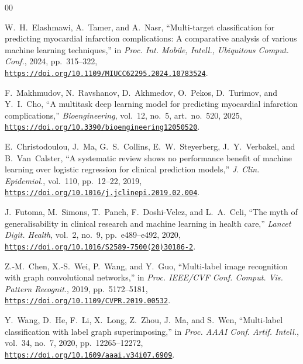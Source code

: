\documentclass{ieeeaccess}
\begin{document}
\begin{thebibliography}{00}

W.~H.~Elashmawi, A.~Tamer, and A.~Nasr, ``Multi-target classification for predicting myocardial infarction complications: A comparative analysis of various machine learning techniques,'' in \emph{Proc. Int. Mobile, Intell., Ubiquitous Comput. Conf.}, 2024, pp.~315--322, \href{https://doi.org/10.1109/MIUCC62295.2024.10783524}{\nolinkurl{https://doi.org/10.1109/MIUCC62295.2024.10783524}}.

F.~Makhmudov, N.~Ravshanov, D.~Akhmedov, O.~Pekos, D.~Turimov, and Y.~I.~Cho, ``A multitask deep learning model for predicting myocardial infarction complications,'' \emph{Bioengineering}, vol.~12, no.~5, art.~no.~520, 2025, \href{https://doi.org/10.3390/bioengineering12050520}{\nolinkurl{https://doi.org/10.3390/bioengineering12050520}}.

E.~Christodoulou, J.~Ma, G.~S.~Collins, E.~W.~Steyerberg, J.~Y.~Verbakel, and B.~Van~Calster, ``A systematic review shows no performance benefit of machine learning over logistic regression for clinical prediction models,'' \emph{J. Clin. Epidemiol.}, vol.~110, pp.~12--22, 2019, \href{https://doi.org/10.1016/j.jclinepi.2019.02.004}{\nolinkurl{https://doi.org/10.1016/j.jclinepi.2019.02.004}}.

J.~Futoma, M.~Simons, T.~Panch, F.~Doshi-Velez, and L.~A.~Celi, ``The myth of generalisability in clinical research and machine learning in health care,'' \emph{Lancet Digit. Health}, vol.~2, no.~9, pp.~e489--e492, 2020, \href{https://doi.org/10.1016/S2589-7500(20)30186-2}{\nolinkurl{https://doi.org/10.1016/S2589-7500(20)30186-2}}.

Z.-M.~Chen, X.-S.~Wei, P.~Wang, and Y.~Guo, ``Multi-label image recognition with graph convolutional networks,'' in \emph{Proc. IEEE/CVF Conf. Comput. Vis. Pattern Recognit.}, 2019, pp.~5172--5181, \href{https://doi.org/10.1109/CVPR.2019.00532}{\nolinkurl{https://doi.org/10.1109/CVPR.2019.00532}}.

Y.~Wang, D.~He, F.~Li, X.~Long, Z.~Zhou, J.~Ma, and S.~Wen, ``Multi-label classification with label graph superimposing,'' in \emph{Proc. AAAI Conf. Artif. Intell.}, vol.~34, no.~7, 2020, pp.~12265--12272, \href{https://doi.org/10.1609/aaai.v34i07.6909}{\nolinkurl{https://doi.org/10.1609/aaai.v34i07.6909}}.


\end{thebibliography}
\end{document}
